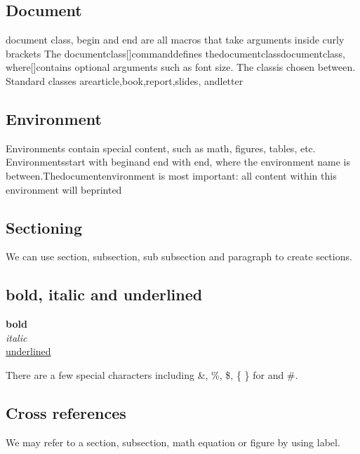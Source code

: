 \documentclass[10pt]{report}
\begin{document}
\subsection{Document}
document class, begin and end are all macros that take arguments inside curly brackets
The documentclass[]{}commanddefines thedocumentclassdocumentclass, where[]contains optional arguments such as font size.
The classis chosen between{}. Standard classes arearticle,book,report,slides, andletter


\subsection{Environment}
Environments contain special content, such as math, figures, tables, etc. Environmentsstart with begin{}and end with end{}, where the environment name is between{}.Thedocumentenvironment is most important: all content within this environment will beprinted


\subsection{Sectioning}
We can use section, subsection, sub subsection and paragraph{}  to create sections.

\subsection{bold, italic and underlined}
\textbf{bold} \\ 
\textit{italic} \\ 
\underline{underlined}

There are a few special characters including \&, \%, \$, \{ \} for {} and \#.

\subsection{Cross references}
We may refer to a section, subsection, math equation or figure by using label.





























\end{document}
